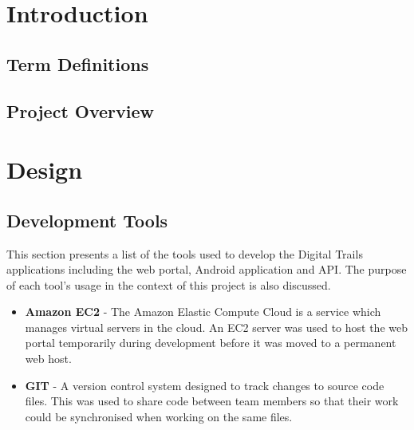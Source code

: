 \documentclass[11pt,a4paper]{report}
\begin{document}


\newpage
\setcounter{page}{1}
\tableofcontents

\newpage
\setcounter{page}{1}
\chapter*{Introduction}

\label{sec:introduction}
\section{Term Definitions}
\label{sec:term-definitions}
\section{Project Overview}
\label{sec:project-overview}

\chapter{Design}
\label{sec:design}

\section{Development Tools}



This section presents a list of the tools used to develop the Digital Trails applications including the web portal, Android application and API. The purpose of each tool's usage in the context of this project is also discussed.



\begin{itemize}

\item \textbf{Amazon EC2} - The Amazon Elastic Compute Cloud is a service which manages virtual servers in the cloud. An EC2 server was used to host the web portal temporarily during development before it was moved to a permanent web host.

\item \textbf{GIT} - A version control system designed to track changes to source code files. This was used to share code between team members so that their work could be synchronised when working on the same files.

\end{itemize}
\end{document}
